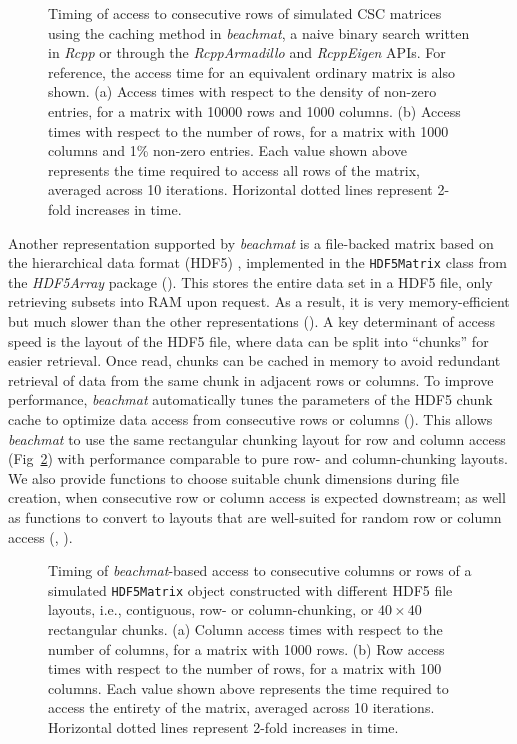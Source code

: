 \documentclass[10pt,letterpaper]{article}
\newcommand{\beachmat}{\textit{beachmat}}
\newcommand{\code}[1]{\texttt{#1}}
\begin{document}
\begin{figure}[b]
    \caption{Timing of access to consecutive rows of simulated CSC matrices using the caching method in \beachmat{}, a naive binary search written in \textit{Rcpp} or through the \textit{RcppArmadillo} and \textit{RcppEigen} APIs.
For reference, the access time for an equivalent ordinary matrix is also shown.
(a) Access times with respect to the density of non-zero entries, for a matrix with 10000 rows and 1000 columns.
(b) Access times with respect to the number of rows, for a matrix with 1000 columns and 1\% non-zero entries.
Each value shown above represents the time required to access all rows of the matrix, averaged across 10 iterations.
Horizontal dotted lines represent 2-fold increases in time.}
\label{fig:sparse}
\end{figure}

Another representation supported by \beachmat{} is a file-backed matrix based on the hierarchical data format (HDF5) \cite{hdf5}, 
implemented in the \texttt{HDF5Matrix} class from the \textit{HDF5Array} package (\suppsechdfmat{}).
This stores the entire data set in a HDF5 file, only retrieving subsets into RAM upon request.
As a result, it is very memory-efficient but much slower than the other representations (\suppfighdfspeed{}).
A key determinant of access speed is the layout of the HDF5 file, where data can be split into ``chunks'' for easier retrieval.
Once read, chunks can be cached in memory to avoid redundant retrieval of data from the same chunk in adjacent rows or columns.
To improve performance, \beachmat{} automatically tunes the parameters of the HDF5 chunk cache to optimize data access from consecutive rows or columns (\suppseclayoutoptim{}).
This allows \beachmat{} to use the same rectangular chunking layout for row and column access (Fig~\ref{fig:hdf5}) with performance comparable to pure row- and column-chunking layouts.
We also provide functions to choose suitable chunk dimensions during file creation, when consecutive row or column access is expected downstream;
as well as functions to convert to layouts that are well-suited for random row or column access (\suppfighdfrandom{}, \suppseclayoutrandom{}).

\begin{figure}[b]
    \caption{Timing of \beachmat{}-based access to consecutive columns or rows of a simulated \code{HDF5Matrix} object constructed with different HDF5 file layouts, 
i.e., contiguous, row- or column-chunking, or $40\times40$ rectangular chunks.
(a) Column access times with respect to the number of columns, for a matrix with 1000 rows.
(b) Row access times with respect to the number of rows, for a matrix with 100 columns.
Each value shown above represents the time required to access the entirety of the matrix, averaged across 10 iterations.
Horizontal dotted lines represent 2-fold increases in time.}
\label{fig:hdf5}
\end{figure}
\end{document}

